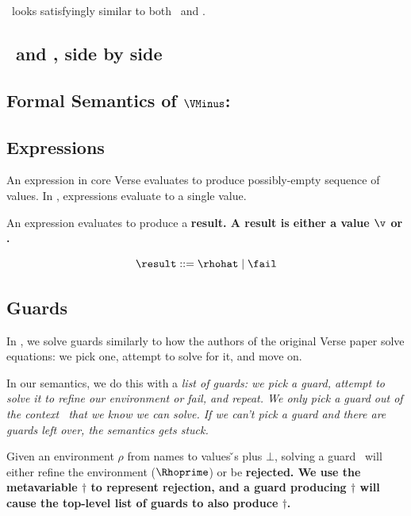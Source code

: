\documentclass[article,screen,12pt, nonacm]{acmart}
\begin{document}
    \VMinus\ looks satisfyingly similar to both \PPlus\ and \VC. 

    \subsection{\VMinus\ and \PPlus, side by side}








\subsection{Formal Semantics of ${\VMinus}$:}
    
    \subsection{Expressions}
    
    \newcommand\GNoTree{\vmrung \rightsquigarrow \uppsidown} 
    
    An expression in core Verse evaluates to produce possibly-empty sequence of
    values. In {\VMinus}, expressions evaluate to a single value. 

    An expression evaluates to produce a \bf{result}. A result is either a
    value $\v$ or \fail. 
    
    \[\result\; \rm{::=}\; \rhohat\; \vert \; \fail \]
    
\subsection{Guards}

In {\VMinus}, we solve guards similarly to how the authors of the original Verse
paper solve equations: we pick one, attempt to solve for it, and move on. 

In our semantics, we do this with a \it{list} of guards: we pick a guard,
attempt to solve it to refine our environment or fail, and repeat. We only pick
a guard out of the context \context\ that we know we can solve. If we can't pick
a guard and there are guards left over, the semantics gets stuck.

Given an environment $\rho$ from names to values {\v}s plus $\bot$, solving a
guard \g\ will either refine the environment ($\Rhoprime$) or be \bf{rejected}.
We use the metavariable $\dagger$ to represent rejection, and a guard producing
$\dagger$ will cause the top-level list of guards to also produce $\dagger$. 
\end{document}
